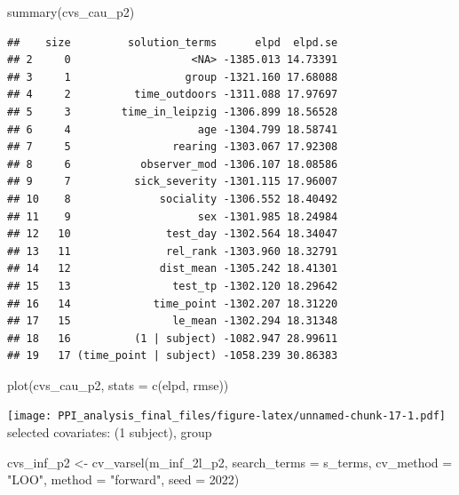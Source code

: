 \documentclass[
]{article}
\newenvironment{Shaded}{\begin{snugshade}}{\end{snugshade}}
\newcommand{\AttributeTok}[1]{\textcolor[rgb]{0.77,0.63,0.00}{#1}}
\newcommand{\DecValTok}[1]{\textcolor[rgb]{0.00,0.00,0.81}{#1}}
\newcommand{\FunctionTok}[1]{\textcolor[rgb]{0.00,0.00,0.00}{#1}}
\newcommand{\NormalTok}[1]{#1}
\newcommand{\OtherTok}[1]{\textcolor[rgb]{0.56,0.35,0.01}{#1}}
\newcommand{\StringTok}[1]{\textcolor[rgb]{0.31,0.60,0.02}{#1}}
\begin{document}
\begin{Shaded}
\begin{Highlighting}[]
\FunctionTok{summary}\NormalTok{(cvs\_cau\_p2)}
\end{Highlighting}
\end{Shaded}

\begin{verbatim}
##    size         solution_terms      elpd  elpd.se
## 2     0                   <NA> -1385.013 14.73391
## 3     1                  group -1321.160 17.68088
## 4     2          time_outdoors -1311.088 17.97697
## 5     3        time_in_leipzig -1306.899 18.56528
## 6     4                    age -1304.799 18.58741
## 7     5                rearing -1303.067 17.92308
## 8     6           observer_mod -1306.107 18.08586
## 9     7          sick_severity -1301.115 17.96007
## 10    8              sociality -1306.552 18.40492
## 11    9                    sex -1301.985 18.24984
## 12   10               test_day -1302.564 18.34047
## 13   11               rel_rank -1303.960 18.32791
## 14   12              dist_mean -1305.242 18.41301
## 15   13                test_tp -1302.120 18.29642
## 16   14             time_point -1302.207 18.31220
## 17   15                le_mean -1302.294 18.31348
## 18   16          (1 | subject) -1082.947 28.99611
## 19   17 (time_point | subject) -1058.239 30.86383
\end{verbatim}

\begin{Shaded}
\begin{Highlighting}[]
\FunctionTok{plot}\NormalTok{(cvs\_cau\_p2, }\AttributeTok{stats =} \FunctionTok{c}\NormalTok{(}\StringTok{\textquotesingle{}elpd\textquotesingle{}}\NormalTok{, }\StringTok{\textquotesingle{}rmse\textquotesingle{}}\NormalTok{))}
\end{Highlighting}
\end{Shaded}

\texttt{[image: PPI\_analysis\_final\_files/figure-latex/unnamed-chunk-17-1.pdf]}
selected covariates: (1 \textbar{} subject), group

\begin{Shaded}
\begin{Highlighting}[]
\NormalTok{cvs\_inf\_p2 }\OtherTok{\textless{}{-}} \FunctionTok{cv\_varsel}\NormalTok{(m\_inf\_2l\_p2, }
                        \AttributeTok{search\_terms =}\NormalTok{ s\_terms, }
                        \AttributeTok{cv\_method =} \StringTok{"LOO"}\NormalTok{, }\AttributeTok{method =} \StringTok{"forward"}\NormalTok{, }
                        \AttributeTok{seed =} \DecValTok{2022}\NormalTok{)}
\end{Highlighting}
\end{Shaded}
\end{document}
